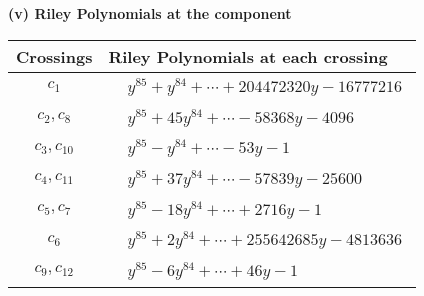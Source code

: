 \documentclass[1p]{elsarticle_modified}
\theoremstyle{definition}
\begin{document}
\flushleft \textbf{(v) Riley Polynomials at the component}\newline \\
\begin{tabular}{m{50pt}|m{274pt}}
Crossings & \hspace{64pt}Riley Polynomials at each crossing \\
\hline $$\begin{aligned}c_{1}\end{aligned}$$&$\begin{aligned}
&y^{85}+y^{84}+\cdots+204472320 y-16777216
\end{aligned}$\\
\hline $$\begin{aligned}c_{2},c_{8}\end{aligned}$$&$\begin{aligned}
&y^{85}+45 y^{84}+\cdots-58368 y-4096
\end{aligned}$\\
\hline $$\begin{aligned}c_{3},c_{10}\end{aligned}$$&$\begin{aligned}
&y^{85}- y^{84}+\cdots-53 y-1
\end{aligned}$\\
\hline $$\begin{aligned}c_{4},c_{11}\end{aligned}$$&$\begin{aligned}
&y^{85}+37 y^{84}+\cdots-57839 y-25600
\end{aligned}$\\
\hline $$\begin{aligned}c_{5},c_{7}\end{aligned}$$&$\begin{aligned}
&y^{85}-18 y^{84}+\cdots+2716 y-1
\end{aligned}$\\
\hline $$\begin{aligned}c_{6}\end{aligned}$$&$\begin{aligned}
&y^{85}+2 y^{84}+\cdots+255642685 y-4813636
\end{aligned}$\\
\hline $$\begin{aligned}c_{9},c_{12}\end{aligned}$$&$\begin{aligned}
&y^{85}-6 y^{84}+\cdots+46 y-1
\end{aligned}$\\
\hline
\end{tabular}\\~\\
\end{document}
